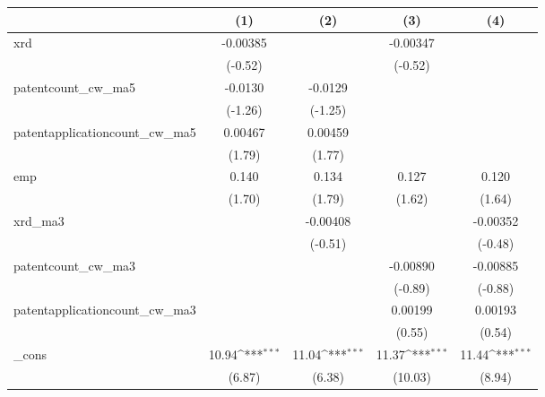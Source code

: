 {
\def\sym#1{\ifmmode^{#1}\else\(^{#1}\)\fi}
\begin{tabular}{l*{4}{c}}
\hline\hline
            &\multicolumn{1}{c}{(1)}         &\multicolumn{1}{c}{(2)}         &\multicolumn{1}{c}{(3)}         &\multicolumn{1}{c}{(4)}         \\
\hline
xrd         &    -0.00385         &                     &    -0.00347         &                     \\
            &     (-0.52)         &                     &     (-0.52)         &                     \\
[1em]
patentcount\_cw\_ma5&     -0.0130         &     -0.0129         &                     &                     \\
            &     (-1.26)         &     (-1.25)         &                     &                     \\
[1em]
patentapplicationcount\_cw\_ma5&     0.00467         &     0.00459         &                     &                     \\
            &      (1.79)         &      (1.77)         &                     &                     \\
[1em]
emp         &       0.140         &       0.134         &       0.127         &       0.120         \\
            &      (1.70)         &      (1.79)         &      (1.62)         &      (1.64)         \\
[1em]
xrd\_ma3     &                     &    -0.00408         &                     &    -0.00352         \\
            &                     &     (-0.51)         &                     &     (-0.48)         \\
[1em]
patentcount\_cw\_ma3&                     &                     &    -0.00890         &    -0.00885         \\
            &                     &                     &     (-0.89)         &     (-0.88)         \\
[1em]
patentapplicationcount\_cw\_ma3&                     &                     &     0.00199         &     0.00193         \\
            &                     &                     &      (0.55)         &      (0.54)         \\
[1em]
\_cons      &       10.94\sym{***}&       11.04\sym{***}&       11.37\sym{***}&       11.44\sym{***}\\
            &      (6.87)         &      (6.38)         &     (10.03)         &      (8.94)         \\

\end{tabular}}
